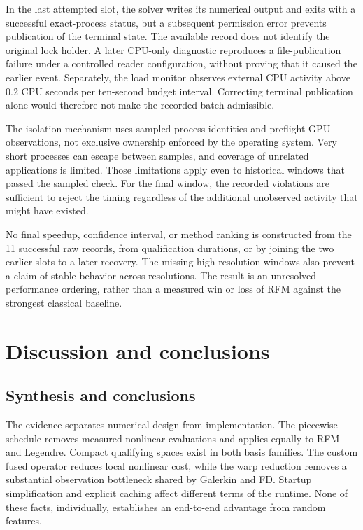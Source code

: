 In the last attempted slot, the solver writes its numerical output and exits with a successful exact-process status, but a subsequent permission error prevents publication of the terminal state. The available record does not identify the original lock holder. A later CPU-only diagnostic reproduces a file-publication failure under a controlled reader configuration, without proving that it caused the earlier event. Separately, the load monitor observes external CPU activity above $0.2$ CPU seconds per ten-second budget interval. Correcting terminal publication alone would therefore not make the recorded batch admissible.

The isolation mechanism uses sampled process identities and preflight GPU observations, not exclusive ownership enforced by the operating system. Very short processes can escape between samples, and coverage of unrelated applications is limited. Those limitations apply even to historical windows that passed the sampled check. For the final window, the recorded violations are sufficient to reject the timing regardless of the additional unobserved activity that might have existed.

No final speedup, confidence interval, or method ranking is constructed from the 11 successful raw records, from qualification durations, or by joining the two earlier slots to a later recovery. The missing high-resolution windows also prevent a claim of stable behavior across resolutions. The result is an unresolved performance ordering, rather than a measured win or loss of RFM against the strongest classical baseline.

\section{Discussion and conclusions}
\label{sec:discussion}



\subsection{Synthesis and conclusions}

The evidence separates numerical design from implementation. The piecewise schedule removes measured nonlinear evaluations and applies equally to RFM and Legendre. Compact qualifying spaces exist in both basis families. The custom fused operator reduces local nonlinear cost, while the warp reduction removes a substantial observation bottleneck shared by Galerkin and FD. Startup simplification and explicit caching affect different terms of the runtime. None of these facts, individually, establishes an end-to-end advantage from random features.

